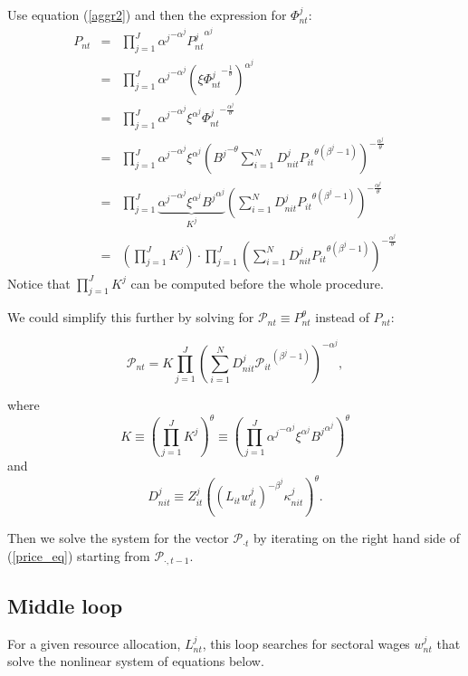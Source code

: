 \documentclass[11pt,oneside,a4paper]{article}
\begin{document}
Use equation (\ref{aggr2}) and then the expression for $\Phi_{nt}^j$:
\begin{eqnarray*}
  P_{nt} &=&  \prod_{j = 1}^J {\alpha^j}^{- \alpha^j} {P_{nt}^j}^{\alpha^j}\\
  &=& \prod_{j = 1}^J {\alpha^j}^{- \alpha^j} \left(\xi {\Phi_{nt}^j}^{-\frac{1}{\theta}}\right)^{\alpha^j}\\
  &=& \prod_{j = 1}^J {\alpha^j}^{- \alpha^j} \xi^{\alpha^j} {\Phi_{nt}^j}^{-\frac{\alpha^j}{\theta}}\\
  &=& \prod_{j = 1}^J {\alpha^j}^{- \alpha^j} \xi^{\alpha^j} \left({B^j}^{-\theta} \sum_{i = 1}^N D_{nit}^j{P_{it}}^{\theta(\beta^j - 1)}\right)^{-\frac{\alpha^j}{\theta}}\\
  &=& \prod_{j = 1}^J \underbrace{{\alpha^j}^{- \alpha^j} \xi^{\alpha^j} {B^j}^{\alpha^j}}_{K^j} \left(\sum_{i = 1}^N D_{nit}^j{P_{it}}^{\theta(\beta^j - 1)}\right)^{-\frac{\alpha^j}{\theta}}\\
  &=& \left( \prod_{j = 1}^J K^j \right) \cdot \prod_{j = 1}^J \left(\sum_{i = 1}^N D_{nit}^j {P_{it}}^{\theta(\beta^j - 1)}\right)^{-\frac{\alpha^j}{\theta}}
\end{eqnarray*}
%
Notice that $\prod_{j = 1}^J K^j$ can be computed before the whole procedure.

%
We could simplify this further by solving for $\mathcal{P}_{nt} \equiv P_{nt}^{\theta}$ instead of $P_{nt}$:

\begin{equation}
\mathcal{P}_{nt} = K \prod_{j = 1}^J \left(\sum_{i = 1}^N D_{nit}^j {\mathcal{P}_{it}}^{(\beta^j - 1)}\right)^{-\alpha^j}, \label{price_eq}
\end{equation}

where $$K \equiv \left(\prod_{j = 1}^J K^j\right)^\theta \equiv \left(\prod_{j = 1}^J {\alpha^j}^{- \alpha^j} \xi^{\alpha^j} {B^j}^{\alpha^j} \right)^\theta$$
%
and $$D_{nit}^j \equiv Z_{it}^j {\left((L_{it}w_{it}^j)^{- \beta^j} \kappa_{nit}^j\right)}^{\theta}.$$

Then we solve the system for the vector $\mathcal{P}_{\cdot t}$ by iterating on the right hand side of (\ref{price_eq}) starting from $\mathcal{P}_{\cdot ,t-1}$.

\newpage
\subsection{Middle loop}
For a given resource allocation, $L_{nt}^j$, this loop searches for sectoral wages $w_{nt}^j$ that solve the nonlinear system of equations below.
\end{document}
